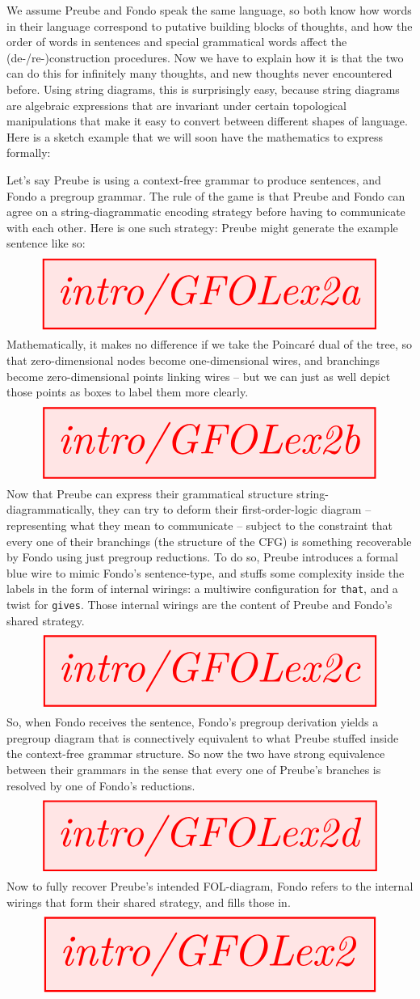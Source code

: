 We assume Preube and Fondo speak the same language, so both know how words in their language correspond to putative building blocks of thoughts, and how the order of words in sentences and special grammatical words affect the (de-/re-)construction procedures. Now we have to explain how it is that the two can do this for infinitely many thoughts, and new thoughts never encountered before. Using string diagrams, this is surprisingly easy, because string diagrams are algebraic expressions that are invariant under certain topological manipulations that make it easy to convert between different shapes of language. Here is a sketch example that we will soon have the mathematics to express formally:\\

\begin{example}
Let's say Preube is using a context-free grammar to produce sentences, and Fondo a pregroup grammar. The rule of the game is that Preube and Fondo can agree on a string-diagrammatic encoding strategy before having to communicate with each other. Here is one such strategy: Preube might generate the example sentence like so:
\[\resizebox{\textwidth}{!}{\tikzfig{intro/GFOLex2a}}\]
Mathematically, it makes no difference if we take the Poincar\'{e} dual of the tree, so that zero-dimensional nodes become one-dimensional wires, and branchings become zero-dimensional points linking wires -- but we can just as well depict those points as boxes to label them more clearly.
\[\resizebox{\textwidth}{!}{\tikzfig{intro/GFOLex2b}}\]
Now that Preube can express their grammatical structure string-diagrammatically, they can try to deform their first-order-logic diagram -- representing what they mean to communicate -- subject to the constraint that every one of their branchings (the structure of the CFG) is something recoverable by Fondo using just pregroup reductions. To do so, Preube introduces a formal blue wire to mimic Fondo's sentence-type, and stuffs some complexity inside the labels in the form of internal wirings: a multiwire configuration for \texttt{that}, and a twist for \texttt{gives}. Those internal wirings are the content of Preube and Fondo's shared strategy.
\[\resizebox{\textwidth}{!}{\tikzfig{intro/GFOLex2c}}\]
So, when Fondo receives the sentence, Fondo's pregroup derivation yields a pregroup diagram that is connectively equivalent to what Preube stuffed inside the context-free grammar structure. So now the two have strong equivalence between their grammars in the sense that every one of Preube's branches is resolved by one of Fondo's reductions.
\[\resizebox{\textwidth}{!}{\tikzfig{intro/GFOLex2d}}\]
Now to fully recover Preube's intended FOL-diagram, Fondo refers to the internal wirings that form their shared strategy, and fills those in.
\[\resizebox{\textwidth}{!}{\tikzfig{intro/GFOLex2}}\]
\end{example}

